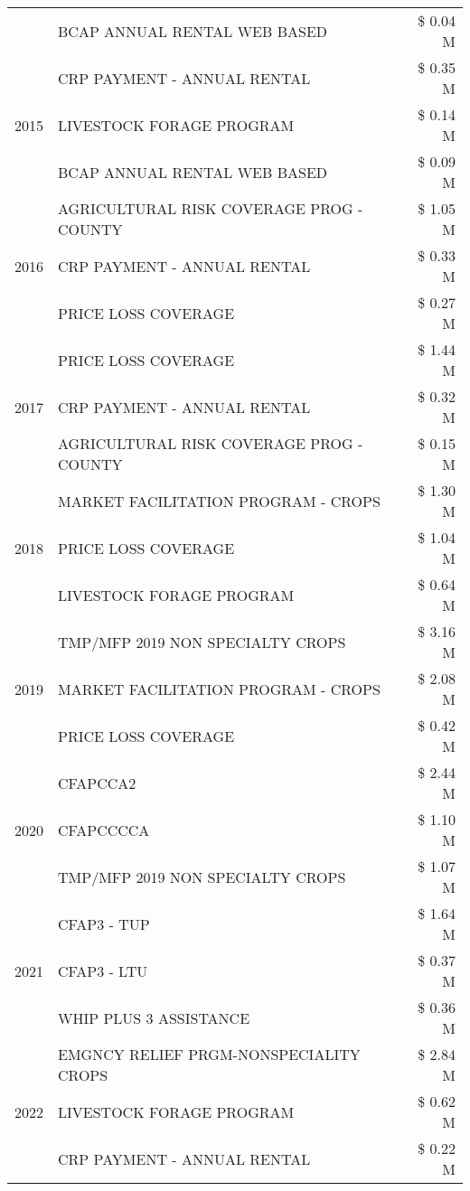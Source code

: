 \begin{tabular}{llr}
 & BCAP ANNUAL RENTAL WEB BASED & \$ 0.04 M \\
\cline{1-3}
\multirow[t]{3}{*}{2015} & CRP PAYMENT - ANNUAL RENTAL & \$ 0.35 M \\
 & LIVESTOCK FORAGE PROGRAM & \$ 0.14 M \\
 & BCAP ANNUAL RENTAL WEB BASED & \$ 0.09 M \\
\cline{1-3}
\multirow[t]{3}{*}{2016} & AGRICULTURAL RISK COVERAGE PROG - COUNTY & \$ 1.05 M \\
 & CRP PAYMENT - ANNUAL RENTAL & \$ 0.33 M \\
 & PRICE LOSS COVERAGE & \$ 0.27 M \\
\cline{1-3}
\multirow[t]{3}{*}{2017} & PRICE LOSS COVERAGE & \$ 1.44 M \\
 & CRP PAYMENT - ANNUAL RENTAL & \$ 0.32 M \\
 & AGRICULTURAL RISK COVERAGE PROG - COUNTY & \$ 0.15 M \\
\cline{1-3}
\multirow[t]{3}{*}{2018} & MARKET FACILITATION PROGRAM - CROPS & \$ 1.30 M \\
 & PRICE LOSS COVERAGE & \$ 1.04 M \\
 & LIVESTOCK FORAGE PROGRAM & \$ 0.64 M \\
\cline{1-3}
\multirow[t]{3}{*}{2019} & TMP/MFP 2019 NON SPECIALTY CROPS & \$ 3.16 M \\
 & MARKET FACILITATION PROGRAM - CROPS & \$ 2.08 M \\
 & PRICE LOSS COVERAGE & \$ 0.42 M \\
\cline{1-3}
\multirow[t]{3}{*}{2020} & CFAPCCA2 & \$ 2.44 M \\
 & CFAPCCCCA & \$ 1.10 M \\
 & TMP/MFP 2019 NON SPECIALTY CROPS & \$ 1.07 M \\
\cline{1-3}
\multirow[t]{3}{*}{2021} & CFAP3 - TUP & \$ 1.64 M \\
 & CFAP3 - LTU & \$ 0.37 M \\
 & WHIP PLUS 3 ASSISTANCE & \$ 0.36 M \\
\cline{1-3}
\multirow[t]{3}{*}{2022} & EMGNCY RELIEF PRGM-NONSPECIALITY CROPS & \$ 2.84 M \\
 & LIVESTOCK FORAGE PROGRAM & \$ 0.62 M \\
 & CRP PAYMENT - ANNUAL RENTAL & \$ 0.22 M \\
\cline{1-3}
\bottomrule
\end{tabular}

